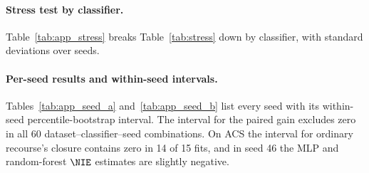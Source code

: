 \paragraph{Stress test by classifier.}
Table~\ref{tab:app_stress} breaks Table~\ref{tab:stress} down by classifier,
with standard deviations over seeds.

\paragraph{Per-seed results and within-seed intervals.}
Tables~\ref{tab:app_seed_a} and~\ref{tab:app_seed_b} list every seed with its
within-seed percentile-bootstrap interval. The interval for the paired gain
excludes zero in all 60 dataset--classifier--seed combinations. On ACS the
interval for ordinary recourse's closure contains zero in 14 of 15 fits, and
in seed 46 the MLP and random-forest $\NIE$ estimates are slightly negative.

